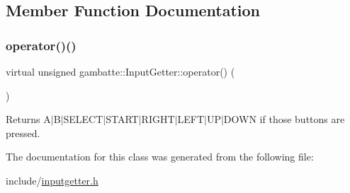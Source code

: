 \subsection{Member Function Documentation}
\mbox{\label{classgambatte_1_1InputGetter_afe2d592abb64686ea9ab98513a51afb0}} 
\subsubsection{\texorpdfstring{operator()()}{operator()()}}
{\footnotesize\ttfamily virtual unsigned gambatte\+::\+Input\+Getter\+::operator() (\begin{DoxyParamCaption}{ }\end{DoxyParamCaption})\hspace{0.3cm}{\ttfamily [pure virtual]}}

\begin{DoxyReturn}{Returns}
A$\vert$\+B$\vert$\+S\+E\+L\+E\+C\+T$\vert$\+S\+T\+A\+R\+T$\vert$\+R\+I\+G\+H\+T$\vert$\+L\+E\+F\+T$\vert$\+U\+P$\vert$\+D\+O\+WN if those buttons are pressed. 
\end{DoxyReturn}


The documentation for this class was generated from the following file\+:\begin{DoxyCompactItemize}
\item 
include/\hyperlink{inputgetter_8h}{inputgetter.\+h}\end{DoxyCompactItemize}
